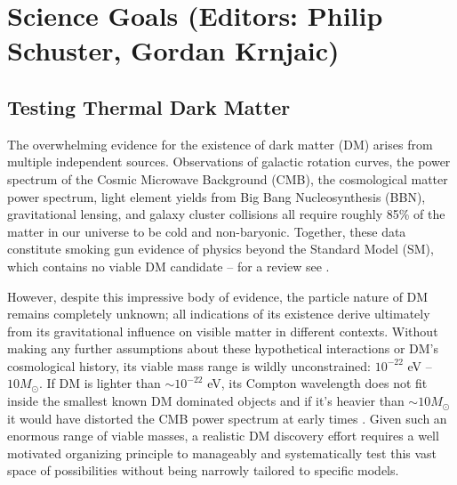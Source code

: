 \section{Science Goals (Editors: Philip Schuster, Gordan Krnjaic)}

\subsection{Testing Thermal Dark Matter}

The overwhelming evidence for the existence of dark matter (DM) arises from multiple independent sources. 
 Observations of galactic rotation curves, the power spectrum of the Cosmic Microwave Background (CMB), 
the cosmological matter power spectrum, light element yields from Big Bang Nucleosynthesis (BBN), gravitational
lensing, and galaxy cluster collisions all require roughly 85\% of the matter in our universe to be cold and non-baryonic. 
Together, these data constitute smoking gun evidence  of physics beyond the Standard Model (SM), which contains
no viable DM candidate -- for a review see \cite{Bertone:2004pz}.

However, despite this impressive body of evidence, the particle nature of DM remains completely unknown; all indications of 
its existence derive ultimately from its gravitational influence on visible matter in different contexts. 
Without making any further assumptions about these hypothetical interactions or DM's cosmological history,
 its viable mass range is wildly unconstrained: $10^{-22} $ eV -- $10 M_{\odot}$.  If DM is lighter than $\sim 10^{-22}$ eV, 
 its Compton wavelength does not fit inside the smallest known DM dominated objects \cite{Navarro:1995iw} and if it's heavier than $\sim 10 M_{\odot}$ 
 it would have distorted the CMB power spectrum at early times \cite{Bird:2016dcv}. Given such an enormous range of viable masses, a realistic DM discovery effort requires a well motivated organizing principle to manageably and systematically test this vast space of possibilities without being narrowly tailored
 to specific models.

